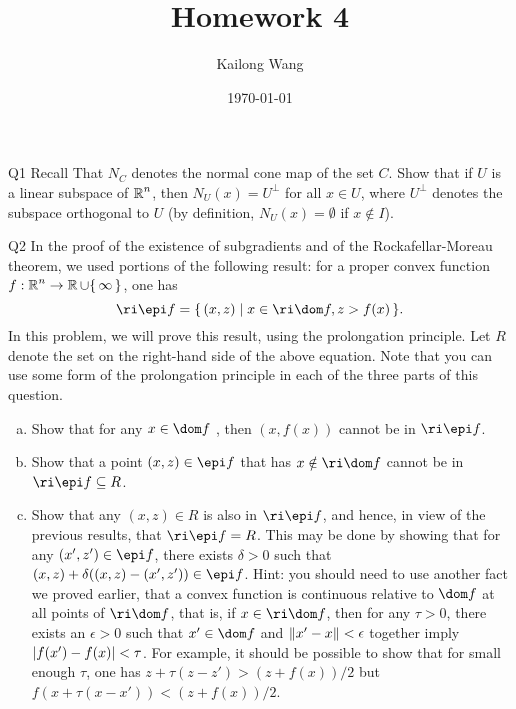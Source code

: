 \documentclass{article}
\title{Homework 4}
\author{Kailong Wang}
\date{\today}
\begin{document}
\maketitle

\begin{problem}
    {Q1}
    Recall That $N_C$ denotes the normal cone map of the set $C$. Show that if $U$ is a linear subspace of $\operatorname{\mathbb{R}}^n$, then $N_U(x)=U^{\bot}$ for all $x\in U$, where $U^{\bot}$ denotes the subspace orthogonal to $U$ (by definition, $N_U(x)=\emptyset$ if $x\notin I$).
\end{problem}

\begin{problem}
    {Q2}
    In the proof of the existence of subgradients and of the Rockafellar-Moreau theorem, we used portions of the following result: for a proper convex function $f:\R^n\rightarrow \R\cup\set{\infty}$, one has \[\ri\epi f=\set{(x,z)\mid x\in\ri\dom f, z>f(x)}.\] In this problem, we will prove this result, using the prolongation principle. Let $R$ denote the set on the right-hand side of the above equation. Note that you can use some form of the prolongation principle in each of the three parts of this question.
    \begin{enumerate}[(a)]
        \item Show that for any $x\in\dom f$ , then $(x,f(x))$ cannot be in $\ri\epi f$.
        \item Show that a point $(x,z)\in\epi f$ that has $x\notin \ri\dom f$ cannot be in $\ri\epi f\subseteq R$.
        \item Show that any $(x,z)\in R$ is also in $\ri\epi f$, and hence, in view of the previous results, that $\ri\epi f=R$. This may be done by showing that for any $(x',z')\in\epi f$, there exists $\delta>0$ such that $(x,z)+\delta((x,z)-(x',z'))\in\epi f$. Hint: you should need to use another fact we proved earlier, that a convex function is continuous relative to $\dom f$ at all points of $\ri\dom f$, that is, if $x\in \ri\dom f$, then for any $\tau>0$, there exists an $\epsilon>0$ such that $x'\in\dom f$ and $\lVert x'-x\rVert<\epsilon$ together imply $\lvert f(x')-f(x)\rvert<\tau$. For example, it should be possible to show that for small enough $\tau$, one has $z+\tau(z-z')>(z+f(x))/2$ but $f(x+\tau(x-x'))<(z+f(x))/2$.
    \end{enumerate}
\end{problem}
\end{document}
